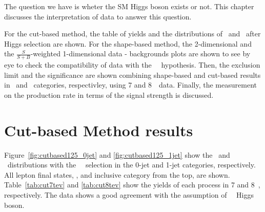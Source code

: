 The question we have is wheter the SM Higgs boson exists or not.  
This chapter discusses the interpretation of data to answer this question.

For the cut-based method, the table of yields and the distributions 
of \mT\ and \mll\ after Higgs selection are shown. 
For the shape-based method, the 2-dimensional and the $\frac{S}{S+B}$-weighted 1-dimensional
data - backgrounds plots are shown to see by eye to check the 
compatibility of data with the ~\GeV\ hypothesis. 
Then, the exclusion limit and the significance are shown combining 
shape-based and cut-based results in \DF\ and \SF\ categories, respectivley, 
using 7 and 8~\TeV\ data. Finally, the measurement on the 
production rate in terms of the signal strength is discussed. 

\section{Cut-based Method results}  

Figure~\ref{fig:cutbased125_0jet} and \ref{fig:cutbased125_1jet} show the
\mT\ and \mll\ distributions with the ~\GeV\ selection 
in the 0-jet and 1-jet categories, respectively. 
All lepton final states, \DF, \SF and inclusive category from the top, are shown. 
Table~\ref{tab:cut7tev} and \ref{tab:cut8tev} show the yields of each process 
in 7 and 8~\TeV, respectively.
The data shows a good agreement with the assumption of ~\GeV\ Higgs boson. 

